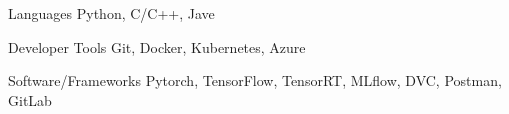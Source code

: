 

\begin{cvskills}
  \cvskill
    {Languages} %
    {Python, C/C++, Jave} %


  \cvskill
    {Developer Tools} %
    {Git, Docker, Kubernetes, Azure} %

  \cvskill
    {Software/Frameworks} %
    {Pytorch, TensorFlow, TensorRT, MLflow, DVC, Postman, GitLab} %


\end{cvskills}
